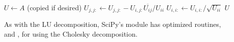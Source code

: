 \begin{algorithm}[H]
\begin{algorithmic}[1]
\State $U \gets A$ (copied if desired)
        \State $U_{j,j:} \gets U_{j,j:} - U_{i,j:}\overline{U_{ij}}/U_{ii}$
    \EndFor
    \State $U_{i,i:} \gets U_{i,i:}/\sqrt{U_{ii}}$
\EndFor
\State {} $U$
\EndProcedure
\end{algorithmic}
\caption{}
\end{algorithm}

As with the LU decomposition, SciPy's  module has optimized routines,\\ and , for using the Cholesky decomposition.

\begin{comment} %
The entries of $L$ are calculated as follows.

\begin{align*}
&L_{i,j} = \frac{1}{L_{j,j}}\left(A_{i,j} -\sum_{k=1}^{j-1}{L_{i,k}L_{j,k}}\right) \mbox{ for $i>j$} \\ \\
&L_{i,i} = \sqrt{A_{i,i} - \sum_{k=1}^{i-1}{L_{i,k}L_{i,k}}}.
\end{align*}

Notice that the entries of $L$ are defined recursively, with dependencies as diagrammed in Figure \ref{fig:cholesky-decomposition-order}.
Thus, an implementation of the Cholesky decomposition must compute the entries of $L$ in the correct order.

\begin{figure}[H]
\begin{tikzpicture}[red dot/.style={draw, circle, fill=red, red},
    norm/.style={draw=none}, xscale=1.5, yscale=1.5]

\begin{scope}[shift={(4,0)}]
\draw [-,ultra thick](-.2,0)--(-.2,2.5);
\draw [-,ultra thick](2.7,0)--(2.7,2.5);
\draw [-,ultra thick](-.2,0)--(0,0);
\draw [-,ultra thick](-.2,2.5)--(0,2.5);
\draw [-,ultra thick](2.7,2.5)--(2.5,2.5);
\draw [-,ultra thick](2.7,0)--(2.5,0);

\node[norm,black](bk1)at(.25,2.25){\LARGE \textbullet};
\node[norm,black](bk2)at(.75,1.75){\LARGE \textbullet};
\node[norm,black!25!](b1)at(1.25,1.25){\LARGE \textbullet};
\node[norm,black](bk3)at(1.75,.75){\LARGE \textbullet};
\node[norm, black](bk4)at(2.25,.25){\LARGE \textbullet};
\node[norm, black!25!](b2)at(.25,1.25){\LARGE \textbullet};
\node[norm,black!25!](b3)at(.75,1.25){\LARGE \textbullet};
\node[norm,black!25!](b4)at(.25,.25){\LARGE \textbullet};
\node[norm,black!25!](b3)at(.75,.25){\LARGE \textbullet};
\node[norm, shadecolor](r1)at(1.25,.25){\Huge \textbullet};
\end{scope}


\end{comment}
